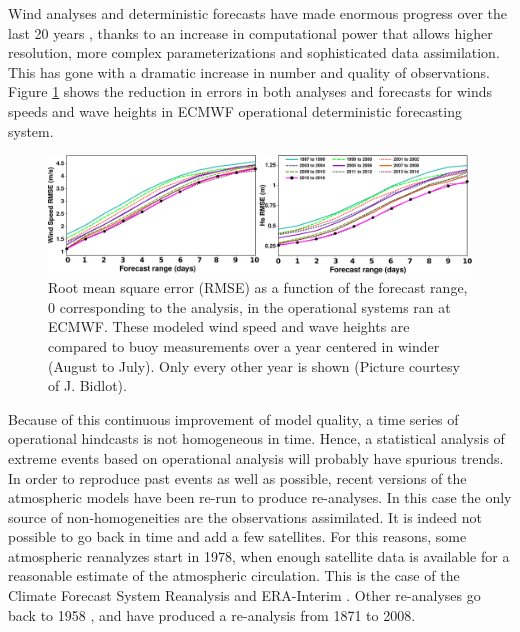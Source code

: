 Wind analyses and deterministic forecasts have made enormous progress over the last 20 years \citep[e.g.][]{Janssen2008a}, 
thanks to an increase in computational power that allows higher resolution, more complex parameterizations and 
sophisticated data assimilation. This has gone with a dramatic increase in number and quality of observations. 
Figure \ref{fig_wind_quality} shows the reduction in errors in both analyses and forecasts for winds speeds and wave heights in ECMWF 
operational deterministic forecasting system. 
\begin{figure}
\centerline{\includegraphics[width=\textwidth]{FIGS_CH_MODEL/wind_quality_v2.pdf}}
\caption{Root mean square error (RMSE) as a function of the forecast range, 0 corresponding to the analysis, in the operational systems ran 
at ECMWF. These modeled wind speed and wave heights are compared to buoy measurements over a year centered in winder 
(August to July). Only every other year is shown (Picture courtesy of J. Bidlot).}
\label{fig_wind_quality}
\end{figure}

Because of this continuous improvement of model quality, a time series of operational hindcasts is not homogeneous in time. Hence, 
a statistical analysis of extreme events based on operational analysis will probably have spurious trends. In order to reproduce 
past events as well as possible, recent versions of the atmospheric models have been re-run to produce re-analyses. In this case 
the only source of non-homogeneities are the observations assimilated. It is indeed not possible to go back in time and add a few satellites. 
For this reasons, some atmospheric reanalyzes start in 1978, when enough satellite data is available for a reasonable estimate of the 
atmospheric circulation. This is the case of the Climate Forecast System Reanalysis  \citep[CFSR][]{Saha&al.2010} 
and ERA-Interim \citep{Dee&al.2011}. Other re-analyses go back to 1958 \citep{Kobayashi&al.2015}, and \cite{Compo&al.2011}
 have produced a re-analysis from 1871 to 2008.
 
